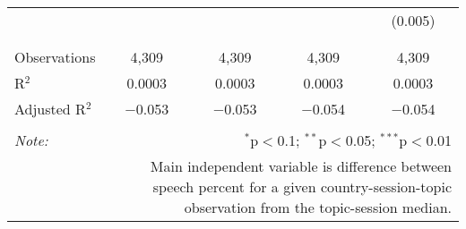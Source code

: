 \begin{table}[!htbp]
\begin{tabular}{@{\extracolsep{5pt}}lcccc}
  &  &  &  & (0.005) \\ 
  & & & & \\ 
\hline \\[-1.8ex] 
Observations & 4,309 & 4,309 & 4,309 & 4,309 \\ 
R$^{2}$ & 0.0003 & 0.0003 & 0.0003 & 0.0003 \\ 
Adjusted R$^{2}$ & $-$0.053 & $-$0.053 & $-$0.054 & $-$0.054 \\ 
\hline 
\hline \\[-1.8ex] 
\textit{Note:}  & \multicolumn{4}{r}{$^{*}$p$<$0.1; $^{**}$p$<$0.05; $^{***}$p$<$0.01} \\ 
 & \multicolumn{4}{r}{Main independent variable is difference between speech percent for a given country-session-topic observation from the topic-session median.} \\ 
\end{tabular} 
\end{table} 
